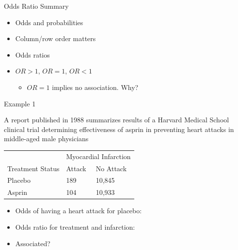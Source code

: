 \documentclass{beamer}
\begin{document}
\begin{frame}{Odds Ratio Summary}

\begin{itemize}
\item Odds and probabilities 
\item Column/row order matters
\item Odds ratios
\item $OR > 1$, $OR = 1$, $OR < 1$
\begin{itemize}
\item $OR = 1$ implies no association. Why?
\end{itemize}
\end{itemize}


\end{frame}


\begin{frame}{Example 1} 

{\scriptsize A report published in 1988 summarizes results of a Harvard Medical School clinical trial determining effectiveness of asprin in preventing heart attacks in middle-aged male physicians}

\begin{center}
\begin{tabular}{|p{3cm}|p{3cm}|p{3cm}|}
\hline
 & \multicolumn{2}{c|}{Myocardial Infarction}      \\ \cline{2-3}
  Treatment Status   & Attack & No Attack      \\ \hline
  Placebo  & 189  & 10,845   \\ \hline
  Asprin & 104   & 10,933   \\ \hline
\end{tabular}
\end{center}

\begin{itemize}
\item Odds of having a heart attack for placebo: 
\item Odds ratio for treatment and infarction:
\item Associated?
\end{itemize}

\end{frame}
\end{document}
